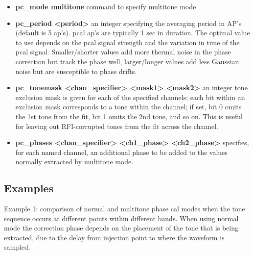 \begin{itemize}
        \item\textbf{pc\_mode multitone} command to specify multitone mode

        \item\textbf{pc\_period <period>} an integer specifying the averaging period in AP's 
                (default is 5 ap's). pcal ap's are typically 1 sec in duration. The optimal value
                to use depends on the pcal signal strength and the variation in time of the pcal
                signal. Smaller/shorter values add more thermal noise in the phase correction but track
                the phase well, larger/longer values add less Gaussian noise but are susceptible
                to phase drifts.

        \item\textbf{pc\_tonemask <chan\_specifier> <mask1> <mask2>} an integer tone exclusion mask
                is given for each of the specified channels; each bit within an exclusion mask
                corresponds to a tone within the channel; if set, bit 0 omits the 1st tone from 
                the fit, bit 1 omits the 2nd tone, and so on. This is useful for leaving out
                RFI-corrupted tones from the fit across the channel.

        \item\textbf{pc\_phases <chan\_specifier> <ch1\_phase> <ch2\_phase>} specifies, for each named channel,
                an additional phase to be added to the values normally extracted by multitone mode.
\end{itemize}


\subsection{Examples}

Example 1: comparison of normal and multitone phase cal modes when the tone 
sequence occurs at different points within different bands. When using normal
mode the correction phase depends on the placement of the tone that is being extracted,
due to the delay from injection point to where the waveform is sampled.





